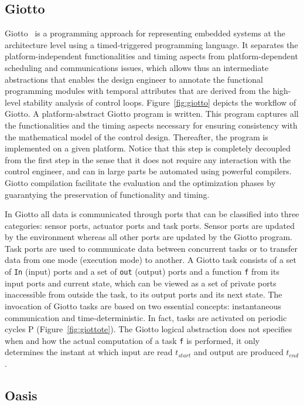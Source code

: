 \subsection{Giotto}
Giotto~\cite{intro:giotto} is a programming approach for representing embedded systems
at the architecture level using a timed-triggered programming language. It separates the
platform-independent functionalities and timing aspects from platform-dependent scheduling 
and communications issues, which allows thus an intermediate abstractions that enables the 
design engineer to annotate the functional programming modules with temporal attributes that 
are derived from the high-level stability analysis of control loops. 
Figure~\ref{fig:giotto} depicts the workflow of Giotto. A platform-abstract Giotto program
is written. This program captures all the functionalities and the timing aspects necessary
for ensuring consistency with the mathematical model of the control design. Thereafter,
the program is implemented on a given platform. Notice that this step is completely decoupled
from the first step in the sense that it does not require any interaction with the control 
engineer, and can in large parts be automated using powerful compilers. 
Giotto compilation facilitate the evaluation and the optimization phases by guarantying 
the preservation of functionality and timing. 

In Giotto all data is communicated through ports that can be classified into three categories:
sensor ports, actuator ports and task ports. Sensor ports are updated by the environment  
whereas all other ports are updated by the Giotto program. Task ports are used to communicate 
data between concurrent tasks or to transfer data from one mode (execution mode) to another.
A Giotto task consists of a set of \texttt{In} (input) ports and a set of \texttt{out} (output)
ports and a function \texttt{f} from its input ports and current state, which can be viewed
as a set of private ports inaccessible from outside the task, to its output ports
and its next state. 
The invocation of Giotto tasks are based on two essential concepts: instantaneous communication
and time-deterministic. In fact, tasks are activated on periodic cycles P 
(Figure~\ref{fig:giottote}). The Giotto logical abstraction 
does not specifies when and how the actual computation of a task \texttt{f} is performed, 
it only determines the instant at which input are read $t_{start}$ and output are produced 
$t_{end}$.

\subsection{Oasis}

